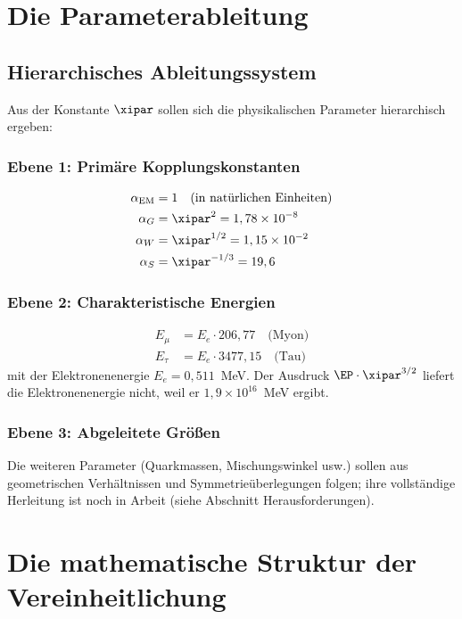 	\section{Die Parameterableitung}
	
	\subsection{Hierarchisches Ableitungssystem}
	
	Aus der Konstante $\xipar$ sollen sich die physikalischen Parameter hierarchisch ergeben:
	
	\subsubsection{Ebene 1: Primäre Kopplungskonstanten}
	\begin{align}
		\alpha_{\text{EM}} &= 1 \quad \text{(in natürlichen Einheiten)} \\
		\alpha_G &= \xipar^2 = 1,78 \times 10^{-8} \\
		\alpha_W &= \xipar^{1/2} = 1,15 \times 10^{-2} \\
			\alpha_S &= \xipar^{-1/3} = 19,6
	\end{align}

	
	\subsubsection{Ebene 2: Charakteristische Energien}
	\begin{align}
		E_\mu &= E_e \cdot 206,77 \quad \text{(Myon)} \\
		E_\tau &= E_e \cdot 3477,15 \quad \text{(Tau)}
	\end{align}
	mit der Elektronenenergie $E_e = 0{,}511$~MeV. Der Ausdruck $\EP \cdot \xipar^{3/2}$ liefert die Elektronenenergie nicht, weil er $1{,}9\times10^{16}$~MeV ergibt.

	
	\subsubsection{Ebene 3: Abgeleitete Größen}
	Die weiteren Parameter (Quarkmassen, Mischungswinkel usw.) sollen aus geometrischen Verhältnissen und Symmetrieüberlegungen folgen; ihre vollständige Herleitung ist noch in Arbeit (siehe Abschnitt Herausforderungen).
	
	\section{Die mathematische Struktur der Vereinheitlichung}
	
